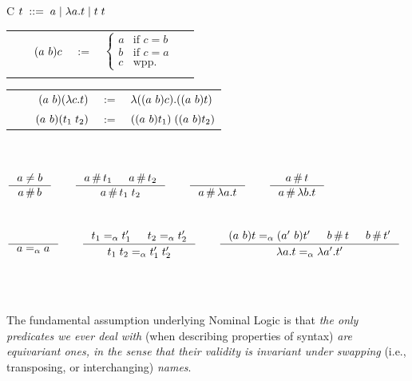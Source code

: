 \documentclass[aspectratio=169]{beamer}
\newcommand{\aequiv}{\ensuremath{=_\alpha}}
\begin{document}
\begin{frame}
  \begin{tabularx}{\textwidth}{C}
    \hspace{9cm}
      $ t \; ::= \; a \mid \lambda a . t \mid t\;t$
    \\
    \begin{tabular}{rcl}
    $\qquad(a\ b) c$ & $:=$
      & $ \begin{cases}
        a & \text{if } c = b \\
        b & \text{if } c = a \\
        c & \text{wpp.}
      \end{cases}$
      $\quad$
       \\ \\
    \end{tabular}
    \begin{tabular}{rcl}
      $\qquad$
      $(a\ b) (\lambda c . t) $ & $:=$
      & $ \lambda ((a\ b) c) . ((a\ b) t)$ \\
      $(a\ b) (t_1\; t_2) $ & $:=$
      & $ ((a\ b) t_1) \; ((a\ b) t_2) $ \\
    \end{tabular}
\\ \hline \\ $
      \inference{
        a \cneq b
      }{
        a \cfresh b
      }
      \qquad
      \inference{
        a \cfresh t_1 & a \cfresh t_2
      }{
        a \cfresh t_1\;t_2
      }
      \qquad
      \inference{
      }{
        a \cfresh \lambda a . t
      }
      \qquad
      \inference{
        a \cfresh t
      }{
        a \cfresh \lambda b . t
      }
      $ \\ \\ \hline \\ $
    \inference{
      \text{}
    }{
      a \aequiv a
    }
    \qquad
    \inference{
      t_1 \aequiv t_1' & t_2 \aequiv t_2'
    }{
      t_1\;t_2 \aequiv t_1'\;t_2'
    }
    \qquad
    \inference{
      \permswap{a}{b}{t} \aequiv \permswap{a'}{b}{t'} & b \cfresh t & b \cfresh t'
    }{
      \lambda a . t \aequiv \lambda a' . t'
    }
    $ \\ \\
\end{tabularx}
\\
\begin{mdframed}[frametitle={\textnormal{\scriptsize \textbf{Andrew M. Pitts}, \textit{``Nominal logic, a first order theory of names and binding''}}:}]
{\footnotesize
The fundamental assumption underlying Nominal Logic is that \textit{the only predicates we ever deal with} (when describing properties of syntax) \textit{are equivariant ones, in the sense that their validity is invariant under swapping} (i.e., transposing, or interchanging) \textit{names}.
}
\end{mdframed}
\end{frame}
\end{document}
